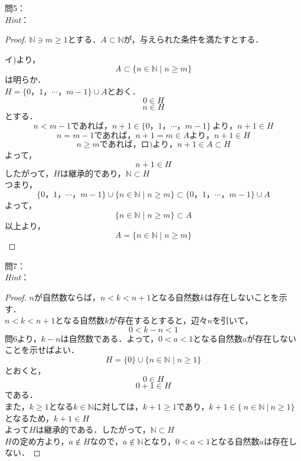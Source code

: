 \documentclass[dvipdfmx,uplatex,11pt]{jsarticle}
\begin{document}
%
\newpage
%
\setcounter{equation}{0}
\noindent
問5：
\\
\textsl{Hint}：\\
\dotfill
%
% 
%
\begin{leftbar}
	\begin{proof}
		$\mathbb{N} \ni m \ge 1$とする．$A \subset \mathbb{N}$が，与えられた条件を満たすとする．\par
		イ)より，
		\[ A \subset \{n \in \mathbb{N} \mid n \ge m\} \]
		は明らか．\\
		$H=\{0，1，\cdots，m-1\} \cup A$とおく．
		\begin{equation}
			0 \in H
		\end{equation}
		\begin{equation}
			n \in H
		\end{equation}
		とする．\\
		\[ n<m-1であれば，n+1 \in \{0，1，\cdots，m-1\}~より，n+1 \in H \]
		\[ n=m-1であれば，n+1=m \in Aより，n+1 \in H\]
		\[ n \ge mであれば，ロ)より，n+1 \in A \subset H \]
		よって，
		\[
			n+1 \in H
		\]
		したがって，$H$は継承的であり，$\mathbb{N} \subset H$\\
		つまり，\\
		\[
			\{0，1，\cdots，m-1\} \cup \{n \in \mathbb{N} \mid n \ge m \} \subset \{0，1，\cdots，m-1\} \cup A
		\]
		よって，
		\[
			\{n \in \mathbb{N}\mid n \ge m \} \subset A
		\]
		以上より，
		\[
			A=\{n \in \mathbb{N} \mid n \ge m\}
		\]
	\end{proof}
\end{leftbar}
%
\newpage
%
\noindent
問7：
\\
\textsl{Hint}：\\
\dotfill
%
\begin{leftbar}
	\begin{proof}
		$n$が自然数ならば，$n <k <n+1$となる自然数$k$は存在しないことを示す．\\
		$n < k < n+1$となる自然数$k$が存在するとすると，辺々$n$を引いて，
		\[ 0 < k - n < 1 \]
		問6より，$k-n$は自然数である．よって，$0<a<1$となる自然数$a$が存在しないことを示せばよい．\\
		\[ H=\{0\} \cup \{n \in \mathbb{N} \mid n \ge 1 \} \]
		とおくと，
		\begin{equation}
			0 \in H
		\end{equation}
		\begin{equation}
			0+1 \in H
		\end{equation}
		である．\\
		また，$k \ge 1$となる$k \in \mathbb{N}$に対しては，$k +1 \ge 1$であり，$k+1 \in \{~n \in \mathbb{N}~|~n \ge 1 \} $となるため，$k+1 \in H$\\
		よって$H$は継承的である．したがって，$\mathbb{N} \subset H$\\
		$H$の定め方より，$a \notin H$なので，$a \notin \mathbb{N}$となり，$0<a<1$となる自然数$a$は存在しない．
	\end{proof}
\end{leftbar}
%
\newpage
%
\setcounter{equation}{0}
\end{document}
